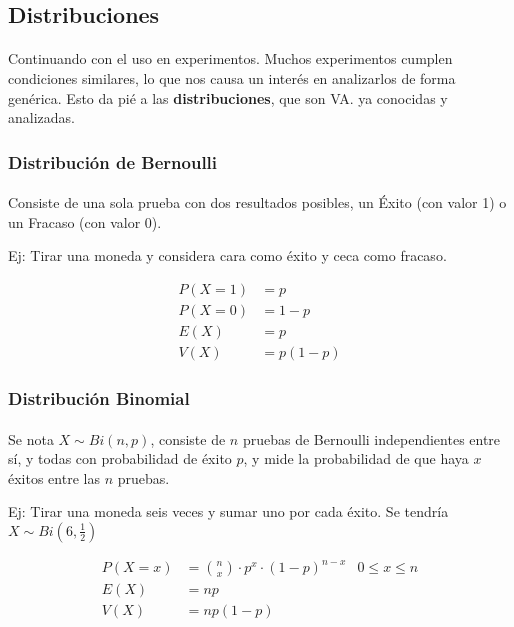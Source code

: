 \documentclass[../main.tex]{subfiles}
\begin{document}
\subsection{Distribuciones}

\paragraph{} Continuando con el uso en experimentos. Muchos experimentos cumplen condiciones similares, lo que nos causa un interés en analizarlos de forma genérica. Esto da pié a las \textbf{distribuciones}, que son VA. ya conocidas y analizadas.

\subsubsection{Distribución de Bernoulli}

\paragraph{} Consiste de una sola prueba con dos resultados posibles, un Éxito (con valor 1) o un Fracaso (con valor 0).

Ej: Tirar una moneda y considera cara como éxito y ceca como fracaso.

\begin{align*}
  P(X = 1) &= p \\
  P(X = 0) &= 1-p \\
  E(X) &= p \\
  V(X) &= p(1-p)
\end{align*}

\subsubsection{Distribución Binomial}

\paragraph{} Se nota \(X \sim Bi(n, p)\), consiste de \(n\) pruebas de Bernoulli independientes entre sí, y todas con probabilidad de éxito \(p\), y mide la probabilidad de que haya \(x\) éxitos entre las \(n\) pruebas.

Ej: Tirar una moneda seis veces y sumar uno por cada éxito. Se tendría \(X \sim Bi(6, \frac{1}{2})\)

\begin{align*}
  P(X = x) &= \binom{n}{x} \cdot p^{x} \cdot (1-p)^{n-x} & 0 \leq x \leq n \\
  E(X) &= np \\
  V(X) &= np(1-p)
\end{align*}
\end{document}
